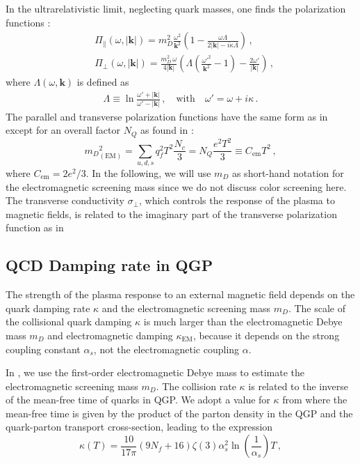 In the ultrarelativistic limit, neglecting quark masses, one finds the polarization functions \cite{Formanek:2021blc}:
\begin{align}\label{eq:polfuncsUltra}
&\Pi_{\parallel}(\omega,|\boldsymbol{k}|) = m_D^2\frac{\omega^2}{\boldsymbol{k}^2}\left(1 - \frac{\omega \Lambda}{2|\boldsymbol{k}|-i\kappa \Lambda}\right)\,,\\
&\Pi_{\perp}(\omega,|\boldsymbol{k}|) = \frac{m_D^2\,\omega}{4 |\boldsymbol{k}|}\left( \Lambda \left(\frac{\omega'^2}{\boldsymbol{k}^2} - 1\right) - \frac{2\omega'}{ |\boldsymbol{k}|}\right)\,,
\end{align}
where $\Lambda(\omega,\boldsymbol{k})$ is defined as
\begin{align}\label{eq:definitions}
 \Lambda \equiv \ln \frac{\omega'+  |\boldsymbol{k}|}{\omega'- |\boldsymbol{k}|}\,, \quad \text{with} \quad \omega' = \omega+i\kappa\,.
\end{align}
The parallel and transverse polarization functions have the same form as in \cite{Formanek:2021blc} except for an overall factor $N_Q$  as found in \cite{Kapusta:1992fm,Grayson:2022asf}:
\begin{equation}\label{eq:DebyemQCD}
    {m_D}^2_{(\text{EM})} = \sum_{u,d,s} q^2_f T^2 \frac{N_c}{3} = N_Q\frac{e^2T^2}{3} \equiv C_{\text{em}}T^2\,,
\end{equation}
where $C_{\text{em}} =  2e^2/3$. In the following, we will use $m_D$ as short-hand notation for the electromagnetic screening mass since we do not discuss color screening here.
The transverse conductivity $\sigma_{\perp}$, which controls the response of the plasma to magnetic fields, is related to the imaginary part of the transverse polarization function as in 



\subsection{QCD Damping rate in QGP}

The strength of the plasma response to an external magnetic field depends on the quark damping rate $\kappa$ and the electromagnetic screening mass $m_D$. The scale of the collisional quark damping $\kappa$ is much larger than the electromagnetic Debye mass $m_D$ and electromagnetic damping $\kappa_{\text{EM}}$, because it depends on the strong coupling constant $\alpha_s$, not the electromagnetic coupling $\alpha$.

In \cite{Grayson:2022asf}, we use the first-order electromagnetic Debye mass  to estimate the electromagnetic screening mass $m_D$. The collision rate $\kappa$ is related to the inverse of the mean-free time of quarks in QGP. We adopt a value for $\kappa$ from \cite{Mrowczynski:1988xu} where the mean-free time is given by the product of the parton density in the QGP and the quark-parton transport cross-section, leading to the expression 
\begin{equation}\label{eq:kappadef}
    \kappa(T) = \frac{10}{17\pi} (9 N_f +16) \zeta(3) \alpha_s^2 \ln\left(\frac{1}{\alpha_s}\right) T\,,
\end{equation}


